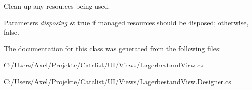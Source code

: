 Clean up any resources being used. 


\begin{DoxyParams}{Parameters}
{\em disposing} & true if managed resources should be disposed; otherwise, false.\\
\hline
\end{DoxyParams}


The documentation for this class was generated from the following files\+:\begin{DoxyCompactItemize}
\item 
C\+:/\+Users/\+Axel/\+Projekte/\+Catalist/\+U\+I/\+Views/Lagerbestand\+View.\+cs\item 
C\+:/\+Users/\+Axel/\+Projekte/\+Catalist/\+U\+I/\+Views/Lagerbestand\+View.\+Designer.\+cs\end{DoxyCompactItemize}
